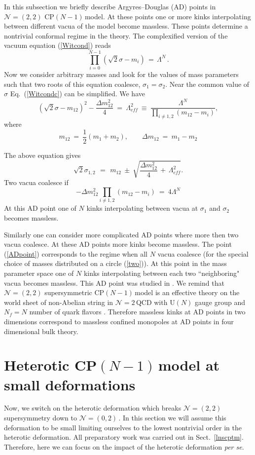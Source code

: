 \documentclass[epsfig,12pt]{article}
\def\beq{\begin{equation}}
\def\eeq{\end{equation}}
\newcommand{\ntwo}{${\mathcal N}=2\,$}
\newcommand{\ntt}{${\mathcal N}=(2,2)\,$}
\newcommand{\nzt}{${\mathcal N}=(0,2)\,$}
\newcommand{\cpn}{CP$(N-1)\,$}
\def\beq{\begin{equation}}
\def\eeq{\end{equation}}
\newcommand{\ntwot}{${\mathcal N}= \left(2,2\right) $ }
\begin{document}
{In this subsection we briefly describe Argyres--Douglas (AD) points in \ntwot \cpn model.
At these points one or more kinks interpolating between different vacua of the model become
massless. These points determine a nontrivial conformal regime in the
theory. The complexified version of the vacuum equation (\ref{Witcond}) reads
\beq
\prod_{i=0}^{N-1}\left(\sqrt{2}\sigma-m_i\right) \,=\,\Lambda^N \,.
\label{Witcondc}
\eeq
Now we consider arbitrary masses and look for the values of mass parameters such that
two roots of this equation coalesce, $\sigma_1=\sigma_2$.  Near the common value of
$\sigma$ Eq.~(\ref{Witcondc}) can be simplified. We have
\beq
\left(\sqrt{2}\sigma-m_{12}\right)^2-\frac{\Delta m^2_{12}}{4} ~=~ \Lambda_{eff}^2 ~\equiv~ 
\frac{\Lambda^N}{\prod_{i\neq 1,2}(m_{12}-m_i)},
\label{sigmaeqAD}
\eeq
where
\beq
m_{12}~=~\frac12(m_1+m_2),\qquad \Delta m_{12}~=~m_1-m_2
\label{m12}
\eeq

The above equation gives
\beq
\sqrt{2}\sigma_{1,2} \,~=~\, m_{12} ~\pm~ \sqrt{\frac{\Delta m^2_{12}}{4} \,+\, \Lambda_{eff}^2}.
\eeq
Two vacua coalesce if 
\beq
-\Delta m^2_{12}\prod_{i\neq 1,2}(m_{12}-m_i) ~=~ 4\Lambda^N
\label{AD}
\eeq
At this AD point one of $N$ kinks interpolating between vacua at $\sigma_1$ and $\sigma_2$
becomes massless.

Similarly one can consider more complicated AD points where more then two vacua coalesce.
At these AD points more kinks become massless. The point (\ref{ADpoint})
corresponds to the regime when all $N$ vacua coalesce (for the special choice of 
masses distributed on a circle (\ref{two})). At this point in the mass parameter space one of $N$ kinks interpolating between each two ``neighboring" vacua becomes massless. This AD point was
studied in \cite{Tadpoint}. We remind that \ntwot supersymmetric \cpn model
is an effective theory on the world sheet of non-Abelian string in \ntwo QCD
with U$(N)$ gauge group and $N_f=N$ number of quark flavors \cite{HT1,ABEKY,SYmon,HT2}.
Therefore massless kinks at AD points in two dimensions correspond to massless confined monopoles
at AD points in four dimensional bulk theory.



\section{Heterotic \cpn model at small deformations}
\label{hecpnsm}
\setcounter{equation}{0}

Now, we switch on the heterotic deformation which breaks \ntt\, supersymmetry down to \nzt.
In this section we will assume this deformation to be small limiting ourselves to the lowest
nontrivial order in the heterotic deformation. All preparatory work was carried out in Sect.~\ref{lnscptm}.
Therefore, here we can focus on the impact of the heterotic deformation {\em per se}.

}
\end{document}
